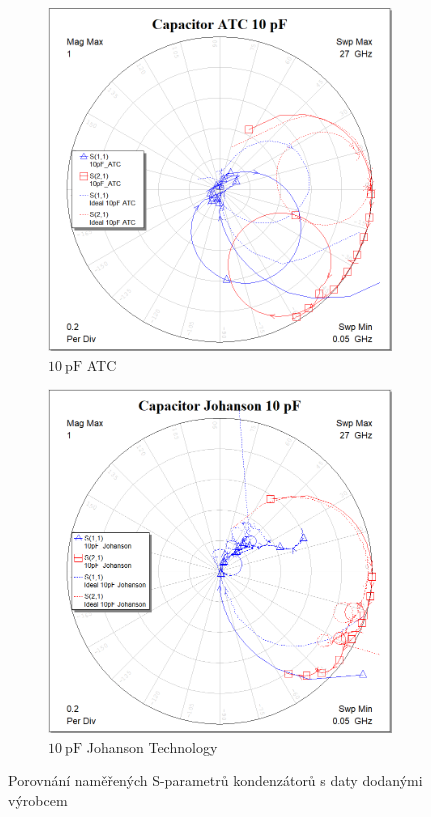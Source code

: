 \documentclass[11pt,a4paper]{article}
\begin{document}
\begin{figure}[!ht]
    \centering
\begin{subfigure}{0.45\textwidth}
    \centering
    \includegraphics[width=\textwidth]{src/capacitor-10pF-ATC.png}
    \caption{$10\ \mathrm{pF}$ ATC}
\end{subfigure}
\begin{subfigure}{0.45\textwidth}
    \centering
    \includegraphics[width=\textwidth]{src/capacitor-10pF-Johanson.png}
    \caption{$10\ \mathrm{pF}$ Johanson Technology}
\end{subfigure}
\caption{\label{fig:capacitors}Porovnání naměřených S-parametrů kondenzátorů s daty dodanými výrobcem}
\end{figure}
\end{document}
